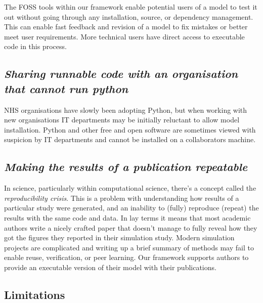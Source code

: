\documentclass{swpaperproc}
\theoremstyle{sw}
\begin{document}
The FOSS tools within our framework enable potential users of a model to test it out without going through any installation, source, or dependency management. This can enable fast feedback and revision of a model to fix mistakes or better meet user requirements. More technical users have direct access to executable code in this process.

\subsection*{\textit{Sharing runnable code with an organisation that cannot run python}}

NHS organisations have slowly been adopting Python, but when working with new organisations IT departments may be initially reluctant to allow model installation. Python and other free and open software are sometimes viewed with suspicion by IT departments and cannot be installed on a collaborators machine.  

\subsection*{\textit{Making the results of a publication repeatable}}

In science, particularly within computational science, there’s a concept called the \textit{reproducibility crisis}. This is a problem with understanding how results of a particular study were generated, and an inability to (fully) reproduce (repeat) the results with the same code and data. In lay terms it means that most academic authors write a nicely crafted paper that doesn’t manage to fully reveal how they got the figures they reported in their simulation study. Modern simulation projects are complicated and writing up a brief summary of methods may fail to enable reuse, verification, or peer learning. Our framework supports 
authors to provide an executable version of their model with their publications.

\subsection{Limitations}
\end{document}
